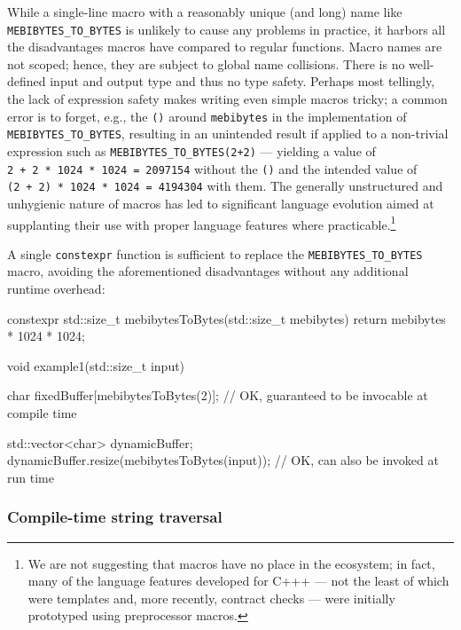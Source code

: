 \noindent While a single-line macro with a reasonably unique (and long) name like
\lstinline!MEBIBYTES_TO_BYTES! is unlikely to cause any problems in
practice, it harbors all the disadvantages macros have compared to
regular functions. Macro names are not scoped; hence, they are subject
to global name collisions. There is no well-defined input and output
type and thus no type safety. Perhaps most tellingly, the lack of
expression safety makes writing even simple macros tricky; a common
error is to forget, e.g., the \lstinline!()! around \lstinline!mebibytes! in
the implementation of \lstinline!MEBIBYTES_TO_BYTES!, resulting in an
unintended result if applied to a non-trivial expression such as
\lstinline!MEBIBYTES_TO_BYTES(2+2)! --- yielding a value of
\lstinline!2!~\lstinline!+!~\lstinline!2!~\lstinline!*!~\lstinline!1024!~\lstinline!*!~\lstinline!1024!~\lstinline!=!~\lstinline!2097154!
without the \lstinline!()! and the intended value of
\lstinline!(2!~\lstinline!+!~\lstinline!2)!~\lstinline!*!~\lstinline!1024!~\lstinline!*!~\lstinline!1024!~\lstinline!=!~\lstinline!4194304!
with them. The generally unstructured and unhygienic nature of macros
has led to significant language evolution aimed at supplanting their use
with proper language features where practicable.{\cprotect\footnote{We
are not suggesting that macros have no place in the ecosystem; in
fact, many of the language features developed for C+++ --- not the
least of which were templates and, more recently, contract checks ---
  were initially prototyped using preprocessor macros.}}

A single \lstinline!constexpr! function is sufficient to replace the
\lstinline!MEBIBYTES_TO_BYTES! macro, avoiding the aforementioned
disadvantages without any additional runtime overhead:

\begin{emcppslisting}[emcppsbatch=e11]
constexpr std::size_t mebibytesToBytes(std::size_t mebibytes)
{
    return mebibytes * 1024 * 1024;
}

void example1(std::size_t input)
{
    char fixedBuffer[mebibytesToBytes(2)];
        // OK, guaranteed to be invocable at compile time

    std::vector<char> dynamicBuffer;
    dynamicBuffer.resize(mebibytesToBytes(input));
        // OK, can also be invoked at run time
}
\end{emcppslisting}


\subsubsection[Compile-time string traversal]{Compile-time string traversal}\label{compile-time-string-traversal}

